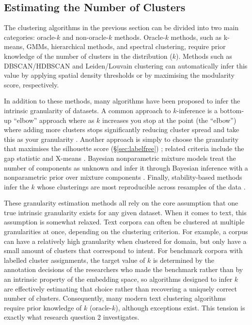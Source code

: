 \documentclass[11pt,a4paper,oneside]{report}
\begin{document}
\subsection{Estimating the Number of Clusters}\label{sec:estimatek}

The clustering algorithms in the previous section can be divided into two main categories: oracle-$k$ and non-oracle-$k$ methods. Oracle-$k$ methods, such as k-means, GMMs, hierarchical methods, and spectral clustering, require prior knowledge of the number of clusters in the distribution ($k$). Methods such as DBSCAN/HDBSCAN and Leiden/Louvain clustering can automatically infer this value by applying spatial density thresholds or by maximising the modularity score, respectively.

In addition to these methods, many algorithms have been proposed to infer the intrinsic granularity of datasets. A common approach to $k$-inference is a bottom-up ``elbow'' approach where as $k$ increases you stop at the point (the ``elbow'') where adding more clusters stops significantly reducing cluster spread and take this as your granularity \citep{thorndike1953who}. Another approach is simply to choose the granularity that maximises the silhouette score (\S\ref{sec:labelfree}) \citep{rousseeuw1987silhouettes}; related criteria include the gap statistic \citep{tibshirani2001gap} and X-means \citep{pelleg2000xmeans}. Bayesian nonparametric mixture models treat the number of components as unknown and infer it through Bayesian inference with a nonparametric prior over mixture components \citep{antoniak1974mixtures,rasmussen2000infinite}. Finally, stability-based methods infer the $k$ whose clusterings are most reproducible across resamples of the data \citep{benhur2002stability,vonluxburg2010stability}.

These granularity estimation methods all rely on the core assumption that one true intrinsic granularity exists for any given dataset. When it comes to text, this assumption is somewhat relaxed. Text corpora can often be clustered at multiple granularities at once, depending on the clustering criterion. For example, a corpus can have a relatively high granularity when clustered for domain, but only have a small amount of clusters that correspond to intent. For benchmark corpora with labelled cluster assignments, the target value of $k$ is determined by the annotation decisions of the researchers who made the benchmark rather than by an intrinsic property of the embedding space, so algorithms designed to infer $k$ are effectively estimating that choice rather than recovering a uniquely correct number of clusters. Consequently, many modern text clustering algorithms require prior knowledge of $k$ (oracle-$k$), although exceptions exist. This tension is exactly what research question 2 investigates.
\end{document}
